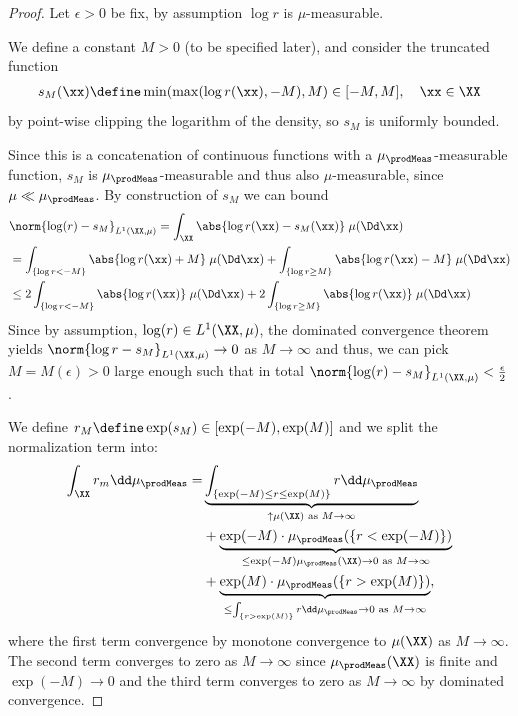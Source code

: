 \documentclass{article}
\begin{document}
\begin{proof}
 Let $\epsilon > 0$  be fix, by assumption $\log r$ is $\mu$-measurable.

 We define a constant $M> 0$ (to be specified later), and consider the truncated function
 \begin{align*}
  s_{ M}(\xx) \define \min(\max(\log r(\xx), -M), M) \in
  [-M, M], \quad \xx\in\XX
 \end{align*}
 by point-wise clipping the logarithm of the density,
 so $s_{M}$ is uniformly bounded.

  Since this is a concatenation of continuous
 functions with a $\mu_\prodMeas$-measurable function,
 $s_{ M}$ is $\mu_\prodMeas$-measurable and thus also $\mu$-measurable,
 since $\mu \ll \mu_\prodMeas$.
 By construction of $s_{ M}$ we can bound
 \begin{align*}
   & \norm{\log(r) - s_{M}}_{L^1(\XX, \mu)}
  = \int_{\XX} \abs{\log r(\xx) - s_{M}(\xx)} \; \mu(\Dd \xx)        \\
   & = \int_{\{\log r < -M\}}  \abs{\log r(\xx) + M} \; \mu(\Dd \xx)
  + \int_{\{\log r \ge M\}}  \abs{\log r(\xx) - M} \; \mu(\Dd \xx)   \\
   & \leq 2\int_{\{\log r < -M\}}  \abs{\log r(\xx)} \; \mu(\Dd \xx)
  + 2\int_{\{\log r \ge M\}}  \abs{\log r(\xx)} \; \mu(\Dd \xx)
 \end{align*}
 Since by assumption, $\log(r) \in L^1(\XX, \mu)$, the dominated convergence
 theorem yields $\norm{\log r - s_{ M}}_{L^1(\XX, \mu)} \to 0$ as $M\to
  \infty$ and thus, we can pick $M = M(\epsilon)> 0$ large enough such that
 in total $\norm{\log(r) - s_{M}}_{L^1(\XX, \mu)} < \frac{\epsilon}{2}$.

  We define $r_M \define \exp(s_M)
  \in [\exp(-M), \exp(M)]$ and we split the normalization term into:
 \begin{align*}
  \int_{\XX} r_m \dd \mu_\prodMeas =
   & \underbrace{\int_{\{\exp(-M)\leq r \leq \exp(M)\}} r \dd
  \mu_\prodMeas}_{\uparrow \mu(\XX) \text{ as } M\to \infty}                     \\
   & + \underbrace{\exp(-M)\cdot\mu_\prodMeas(\{r
  < \exp(-M)\})}_{\leq \exp(-M)\mu_\prodMeas(\XX) \to 0 \text{ as } M\to \infty} \\
   & + \underbrace{\exp(M)\cdot\mu_\prodMeas(\{r
   > \exp(M)\})}_{\leq \int_{\{r > \exp(M)\}} r \dd \mu_\prodMeas \to 0 \text{ as }
  M\to \infty},
 \end{align*}
 where the first term convergence by monotone convergence to $\mu(\XX)$
 as $M\to \infty$. The second term converges to zero as $M\to \infty$
 since $\mu_\prodMeas(\XX)$ is finite and $\exp(-M) \to 0$ and the third
 term converges to zero as $M\to \infty$ by dominated convergence.


\end{proof}
\end{document}
